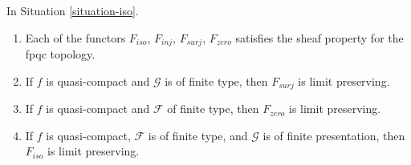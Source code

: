 \begin{lemma}
\label{lemma-iso-sheaf}
In Situation \ref{situation-iso}.
\begin{enumerate}
\item Each of the functors $F_{iso}$, $F_{inj}$, $F_{surj}$, $F_{zero}$
satisfies the sheaf property for the fpqc topology.
\item If $f$ is quasi-compact and $\mathcal{G}$ is of finite type,
then $F_{surj}$ is limit preserving.
\item If $f$ is quasi-compact and $\mathcal{F}$ of finite type, then
$F_{zero}$ is limit preserving.
\item If $f$ is quasi-compact, $\mathcal{F}$ is of finite type, and
$\mathcal{G}$ is of finite presentation, then $F_{iso}$ is limit preserving.
\end{enumerate}
\end{lemma}


